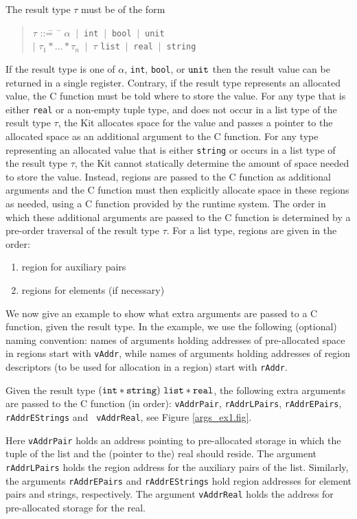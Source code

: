 \documentclass[12pt]{book}
\begin{document}
The result type $\tau$ must be of the form
\begin{quote}
\begin{tabbing}
$\tau$ ::\== ~\= $\alpha$ $~|~$ {\tt int} $~|~$ {\tt bool} $~|~$ {\tt unit} \\ 
  \> $|$ \> $\tau_1 \ast \ldots \ast \tau_n$ $~|~$ $\tau$ {\tt list} $~|~$ {\tt real} $~|~$ {\tt string} 
\end{tabbing}
\end{quote}
\noindent
If the result type is one of $\alpha$, {\tt int}, {\tt bool}, or ${\tt unit}$ then the
result value can be returned in a single register. Contrary, if the result type represents an allocated
value, the C function must be told where to store the value. For
any type that is either {\tt real} or a non-empty tuple type, and
does not occur in a list type of the result type $\tau$, the Kit
allocates space for the value and passes a pointer to the allocated
space as an additional argument to the C function. For any type
representing an allocated value that is either {\tt string} or occurs in a
list type of the result type $\tau$, the Kit cannot statically
determine the amount of space needed to store the value. Instead,
regions are passed to the C function as additional arguments and the C
function must then explicitly allocate space in these regions as
needed, using a C function provided by the runtime system. The order
in which these additional arguments are passed to the C function is determined
by a pre-order traversal of the result type $\tau$.  For a list type,
regions are given in the order:
\begin{enumerate}
    \item region for auxiliary pairs
    \item regions for elements (if necessary)
\end{enumerate}

We now give an example to show what extra arguments are passed to a
C function, given the result type. In the example, we use the following
(optional) naming convention: 
names of arguments holding addresses of 
pre-allocated space in regions 
start with {\tt vAddr}, while names of arguments
holding addresses of region descriptors (to be used for allocation in a
region) start with {\tt rAddr}.
\begin{example}
  Given the result type $({\tt int} \ast {\tt string}) ~{\tt list}
  \ast {\tt real}$, the following extra ar\-gu\-ments are passed to the
  C function (in order): {\tt vAddrPair},
  {\tt rAddrLPairs}, {\tt rAddrEPairs}, {\tt rAddrEStrings} and {\tt
    vAddrReal}, see Figure \ref{args_ex1.fig}. 
  
  Here {\tt vAddrPair} holds an address pointing to pre-allocated
  storage in which the tuple of the list and the (pointer to the) real
  should reside. The argument {\tt rAddrLPairs} holds the region
  address for the auxiliary pairs of the list. Similarly, the
  arguments {\tt rAddrEPairs} and {\tt rAddrEStrings} hold region
  addresses for element pairs and strings, respectively. The argument
  {\tt vAddrReal} holds the address for pre-allocated storage for the
  real.
\end{example}
\end{document}
